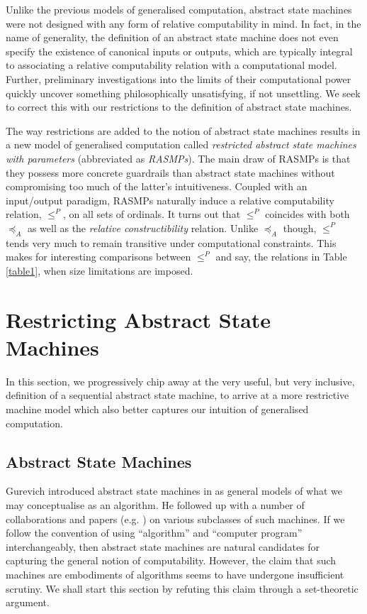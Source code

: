 \documentclass[12pt, twoside]{memoir}
\numberwithin{equation}{section}
\theoremstyle{definition}
\theoremstyle{remark}
\theoremstyle{definition}
\theoremstyle{definition}
\theoremstyle{definition}
\theoremstyle{remark}
\begin{document}
Unlike the previous models of generalised computation, abstract state machines were not designed with any form of relative computability in mind. In fact, in the name of generality, the definition of an abstract state machine does not even specify the existence of canonical inputs or outputs, which are typically integral to associating a relative computability relation with a computational model. Further, preliminary investigations into the limits of their computational power quickly uncover something philosophically unsatisfying, if not unsettling. We seek to correct this with our restrictions to the definition of abstract state machines.

The way restrictions are added to the notion of abstract state machines results in a new model of generalised computation called \textit{restricted abstract state machines with parameters} (abbreviated as \textit{RASMPs}). The main draw of RASMPs is that they possess more concrete guardrails than abstract state machines without compromising too much of the latter's intuitiveness. Coupled with an input/output paradigm, RASMPs naturally induce a relative computability relation, $\leq^P$, on all sets of ordinals. It turns out that $\leq^P$ coincides with both $\preceq_A$ as well as the \textit{relative constructibility} relation. Unlike $\preceq_A$ though, $\leq^P$ tends very much to remain transitive under computational constraints. This makes for interesting comparisons between $\leq^P$ and say, the relations in Table \ref{table1}, when size limitations are imposed.

\section{Restricting Abstract State Machines}

In this section, we progressively chip away at the very useful, but very inclusive, definition of a sequential abstract state machine, to arrive at a more restrictive machine model which also better captures our intuition of generalised computation. 

\subsection{Abstract State Machines}

Gurevich introduced abstract state machines in \cite{gurevich} as general models of what we may conceptualise as an algorithm. He followed up with a number of collaborations and papers (e.g. \cite{gurevichblass}) on various subclasses of such machines. If we follow the convention of using ``algorithm'' and ``computer program'' interchangeably, then abstract state machines are natural candidates for capturing the general notion of computability. However, the claim that such machines are embodiments of algorithms seems to have undergone insufficient scrutiny. We shall start this section by refuting this claim through a set-theoretic argument. 
\end{document}
